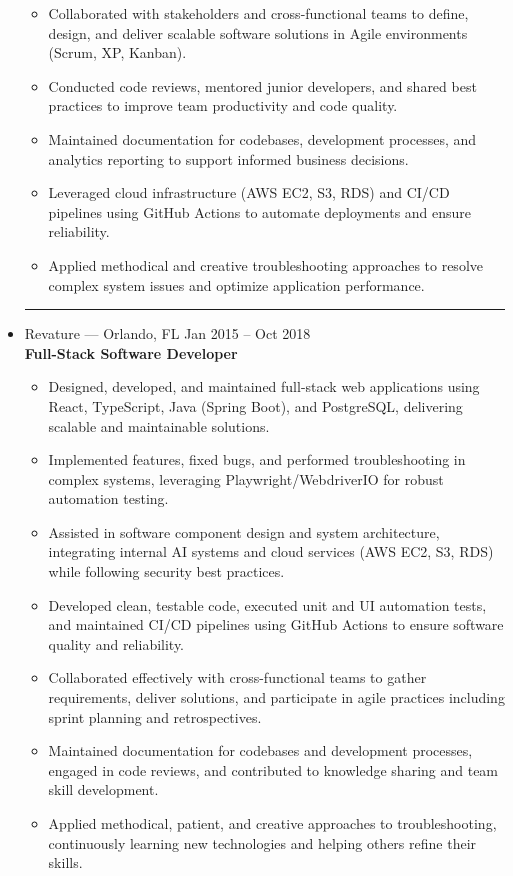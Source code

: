 \documentclass[letterpaper,10pt]{article}
\newcommand{\separator}{\vspace{4pt}\hrule\vspace{4pt}}
\newcommand{\role}[2]{\textbf{#1}\hfill\textit{#2}}
\newcommand{\place}[2]{#1 \hfill #2}
\begin{document}
\begin{itemize}
{\begin{itemize}
            \item{Collaborated with stakeholders and cross-functional teams to define, design, and deliver scalable software solutions in Agile environments (Scrum, XP, Kanban).}
            \item{Conducted code reviews, mentored junior developers, and shared best practices to improve team productivity and code quality.}
            \item{Maintained documentation for codebases, development processes, and analytics reporting to support informed business decisions.}
            \item{Leveraged cloud infrastructure (AWS EC2, S3, RDS) and CI/CD pipelines using GitHub Actions to automate deployments and ensure reliability.}
            \item{Applied methodical and creative troubleshooting approaches to resolve complex system issues and optimize application performance.}     
        \end{itemize}
    }
    \separator
    \item{
        \place{Revature — Orlando, FL}{Jan 2015 – Oct 2018} \\
        \role{Full-Stack Software Developer}{} \\
        \begin{itemize}
            \item{Designed, developed, and maintained full-stack web applications using React, TypeScript, Java (Spring Boot), and PostgreSQL, delivering scalable and maintainable solutions.}
            \item{Implemented features, fixed bugs, and performed troubleshooting in complex systems, leveraging Playwright/WebdriverIO for robust automation testing.}
            \item{Assisted in software component design and system architecture, integrating internal AI systems and cloud services (AWS EC2, S3, RDS) while following security best practices.}
            \item{Developed clean, testable code, executed unit and UI automation tests, and maintained CI/CD pipelines using GitHub Actions to ensure software quality and reliability.}
            \item{Collaborated effectively with cross-functional teams to gather requirements, deliver solutions, and participate in agile practices including sprint planning and retrospectives.}
            \item{Maintained documentation for codebases and development processes, engaged in code reviews, and contributed to knowledge sharing and team skill development.}
            \item{Applied methodical, patient, and creative approaches to troubleshooting, continuously learning new technologies and helping others refine their skills.}
        \end{itemize}
    }
\end{itemize}
\end{document}
